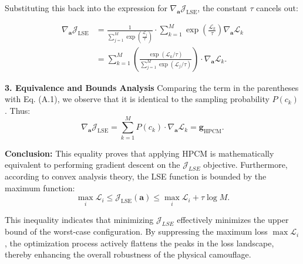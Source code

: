 Substituting this back into the expression for $\nabla_{\mathbf{a}} \mathcal{J}_{\text{LSE}}$, the constant $\tau$ cancels out:

\begin{equation}
\begin{aligned}
\nabla_{\mathbf{a}} \mathcal{J}_{\text{LSE}} &= \frac{1}{\sum_{j=1}^{M} \exp \left( \frac{\mathcal{L}_j}{\tau} \right)} \cdot \sum_{k=1}^{M} \exp \left( \frac{\mathcal{L}_k}{\tau} \right) \nabla_{\mathbf{a}} \mathcal{L}_k \\
&= \sum_{k=1}^{M} \left( \frac{\exp(\mathcal{L}_k/\tau)}{\sum_{j=1}^{M} \exp(\mathcal{L}_j/\tau)} \right) \cdot \nabla_{\mathbf{a}} \mathcal{L}_k.
\end{aligned}
\end{equation}


\textbf{3. Equivalence and Bounds Analysis}
Comparing the term in the parentheses with Eq. (A.1), we observe that it is identical to the sampling probability $P(c_k)$. Thus:
\begin{equation}
    \nabla_{\mathbf{a}} \mathcal{J}_{\text{LSE}} = \sum_{k=1}^{M} P(c_k) \cdot \nabla_{\mathbf{a}} \mathcal{L}_k = \mathbf{g}_{\text{HPCM}}.
\end{equation}


\textbf{Conclusion: }This equality proves that applying HPCM is mathematically equivalent to performing gradient descent on the $\mathcal{J}_{LSE}$ objective.
Furthermore, according to convex analysis theory, the LSE function is bounded by the maximum function:
\begin{equation}
    \max_{i} \mathcal{L}_i \le \mathcal{J}_{\text{LSE}}(\mathbf{a}) \le \max_{i} \mathcal{L}_i + \tau \log M.
\end{equation}


This inequality indicates that minimizing $\mathcal{J}_{LSE}$ effectively minimizes the upper bound of the worst-case configuration. 
By suppressing the maximum loss $\max \mathcal{L}_i$, the optimization process actively flattens the peaks in the loss landscape, thereby enhancing the overall robustness of the physical camouflage.